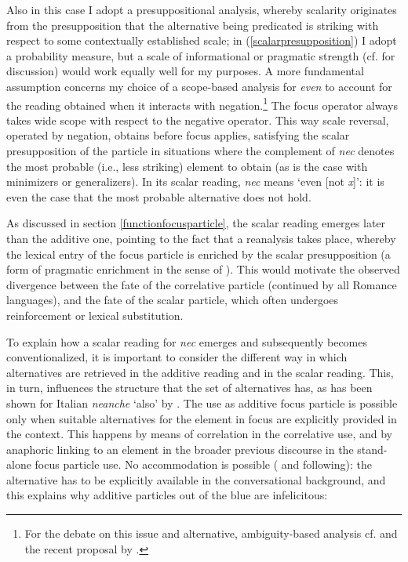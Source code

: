 \documentclass[output=paper,modfonts,nonflat,citecolor=brown,
showindex
]{langsci/langscibook}
\begin{document}
\noindent Also in this case I adopt a presuppositional analysis, whereby scalarity originates from the presupposition that the alternative being predicated is striking with respect to some contextually established scale; in (\ref{scalarpresupposition}) I adopt a probability measure, but a scale of informational or pragmatic strength (cf. \citealt{GastAuwera11} for discussion) would work equally well for my purposes. A more fundamental assumption concerns my choice of a scope-based analysis for {\em{even}} to account for the reading obtained when it interacts with negation.{\footnote{For the debate on this issue and alternative, ambiguity-based analysis cf. \citet[]{Rooth85} and the recent proposal by \citet[]{Collins16}.}} The focus operator always takes wide scope with respect to the negative operator. This way scale reversal, operated by negation, obtains before focus applies, satisfying the scalar presupposition of the particle in situations where the complement of {\em{nec}} denotes the most probable (i.e., less striking) element to obtain (as is the case with minimizers or generalizers). In its scalar reading, {\em{nec}} means `even [not {\em{x}}]': it is even the case that the most probable alternative does not hold.

As discussed in section \ref{functionfocusparticle}, the scalar reading emerges later than the additive one, pointing to the fact that a reanalysis takes place, whereby the lexical entry of the focus particle is enriched by the scalar presupposition (a form of pragmatic enrichment in the sense of \citealt{TraugottDasher02}). This would motivate the observed divergence between the fate of the correlative particle (continued by all Romance languages), and the fate of the scalar particle, which often undergoes reinforcement or lexical substitution.

To explain how a scalar reading for {\em{nec}} emerges and subsequently becomes conventionalized, it is important to consider the different way in which alternatives are retrieved in the additive reading and in the scalar reading. This, in turn, influences the structure that the set of alternatives has, as has been shown for Italian {\em{neanche}} `also' by \citet{Tovena06}. The use as additive focus particle is possible only when suitable alternatives for the element in focus are explicitly provided in the context. This happens by means of correlation in the correlative use, and by anaphoric linking to an element in the broader previous discourse in the stand-alone focus particle use. No accommodation is possible (\citealt[]{Zeevat92} and following): the alternative has to be explicitly available in the conversational background, and this explains why additive particles out of the blue are infelicitous:
\end{document}
